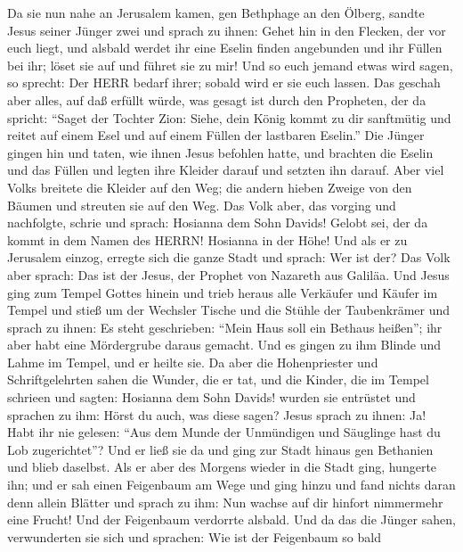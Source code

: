  Da sie nun nahe an Jerusalem kamen, gen Bethphage an den
Ölberg, sandte Jesus seiner Jünger zwei  und sprach zu
ihnen: Gehet hin in den Flecken, der vor euch liegt, und alsbald werdet
ihr eine Eselin finden angebunden und ihr Füllen bei ihr; löset sie auf
und führet sie zu mir!  Und so euch jemand etwas wird sagen,
so sprecht: Der HERR bedarf ihrer; sobald wird er sie euch lassen.
 Das geschah aber alles, auf daß erfüllt würde, was gesagt
ist durch den Propheten, der da spricht:  ``Saget der
Tochter Zion: Siehe, dein König kommt zu dir sanftmütig und reitet auf
einem Esel und auf einem Füllen der lastbaren Eselin.''  Die
Jünger gingen hin und taten, wie ihnen Jesus befohlen hatte,
 und brachten die Eselin und das Füllen und legten ihre
Kleider darauf und setzten ihn darauf.  Aber viel Volks
breitete die Kleider auf den Weg; die andern hieben Zweige von den
Bäumen und streuten sie auf den Weg.  Das Volk aber, das
vorging und nachfolgte, schrie und sprach: Hosianna dem Sohn Davids!
Gelobt sei, der da kommt in dem Namen des HERRN! Hosianna in der Höhe!
 Und als er zu Jerusalem einzog, erregte sich die ganze
Stadt und sprach: Wer ist der?  Das Volk aber sprach: Das
ist der Jesus, der Prophet von Nazareth aus Galiläa.  Und
Jesus ging zum Tempel Gottes hinein und trieb heraus alle Verkäufer und
Käufer im Tempel und stieß um der Wechsler Tische und die Stühle der
Taubenkrämer  und sprach zu ihnen: Es steht geschrieben:
``Mein Haus soll ein Bethaus heißen''; ihr aber habt eine Mördergrube
daraus gemacht.  Und es gingen zu ihm Blinde und Lahme im
Tempel, und er heilte sie.  Da aber die Hohenpriester und
Schriftgelehrten sahen die Wunder, die er tat, und die Kinder, die im
Tempel schrieen und sagten: Hosianna dem Sohn Davids! wurden sie
entrüstet  und sprachen zu ihm: Hörst du auch, was diese
sagen? Jesus sprach zu ihnen: Ja! Habt ihr nie gelesen: ``Aus dem Munde
der Unmündigen und Säuglinge hast du Lob zugerichtet''? 
Und er ließ sie da und ging zur Stadt hinaus gen Bethanien und blieb
daselbst.  Als er aber des Morgens wieder in die Stadt
ging, hungerte ihn;  und er sah einen Feigenbaum am Wege
und ging hinzu und fand nichts daran denn allein Blätter und sprach zu
ihm: Nun wachse auf dir hinfort nimmermehr eine Frucht! Und der
Feigenbaum verdorrte alsbald.  Und da das die Jünger sahen,
verwunderten sie sich und sprachen: Wie ist der Feigenbaum so bald
